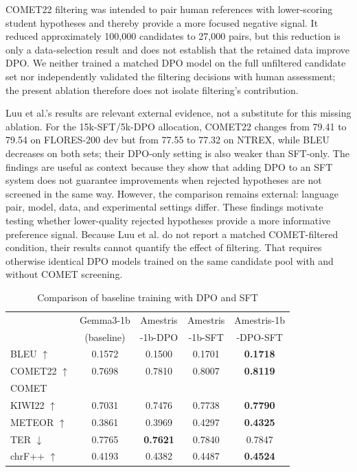 \documentclass[conference]{IEEEtran}
\begin{document}
COMET22 filtering was intended to pair human references with lower-scoring student hypotheses and thereby provide a more focused negative signal. It reduced approximately 100,000 candidates to 27,000 pairs, but this reduction is only a data-selection result and does not establish that the retained data improve DPO. We neither trained a matched DPO model on the full unfiltered candidate set nor independently validated the filtering decisions with human assessment; the present ablation therefore does not isolate filtering's contribution.

Luu et al.'s results are relevant external evidence, not a substitute for this missing ablation. For the 15k-SFT/5k-DPO allocation, COMET22 changes from 79.41 to 79.54 on FLORES-200 dev but from 77.55 to 77.32 on NTREX, while BLEU decreases on both sets; their DPO-only setting is also weaker than SFT-only. The findings are useful as context because they show that adding DPO to an SFT system does not guarantee improvements when rejected hypotheses are not screened in the same way. However, the comparison remains external: language pair, model, data, and experimental settings differ. These findings motivate testing whether lower-quality rejected hypotheses provide a more informative preference signal. Because Luu et al. do not report a matched COMET-filtered condition, their results cannot quantify the effect of filtering. That requires otherwise identical DPO models trained on the same candidate pool with and without COMET screening.

\begin{table}[ht]
    \centering
    \caption{Comparison of baseline training with DPO and SFT}
    \begin{tabular}{|l|c|c|c|c|}
        \hline
         & Gemma3-1b& Amestris& Amestris& Amestris-1b\\ 
         & (baseline) & -1b-DPO& -1b-SFT & -DPO-SFT\\ \hline
        BLEU $\uparrow$ & 0.1572 & 0.1500  &0.1701 &  \textbf{0.1718} \\ \hline
        COMET22 $\uparrow$ & 0.7698 & 0.7810 & 0.8007  & \textbf{0.8119}\\ \hline
        COMET &  & & &  \\ 
        KIWI22 $\uparrow$ & 0.7031 & 0.7476 & 0.7738 & \textbf{0.7790} \\ \hline
        METEOR $\uparrow$ & 0.3861 & 0.3969 &0.4297 &  \textbf{0.4325}\\ \hline
        TER $\downarrow$ & 0.7765 &  \textbf{0.7621} &0.7840 & 0.7847\\ \hline
        chrF++ $\uparrow$ & 0.4193 & 0.4382 & 0.4487 & \textbf{0.4524}\\ \hline
    \end{tabular}
    \label{tab:results1}
\end{table}
\end{document}
